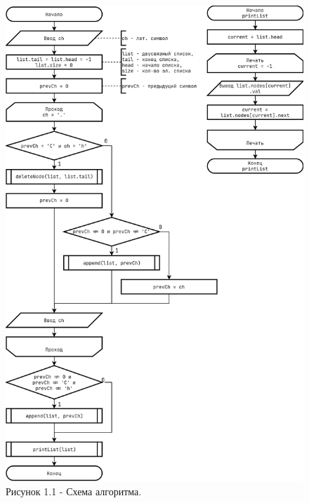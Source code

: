 \documentclass[oneside,a4paper,14pt]{extarticle}
\begin{document}
\newpage
\begin{figure}[!ht]
	\centering
	\includegraphics[height=0.9\textheight]{pics/flowchart_p1.png}
	\caption*{Рисунок 1.1 - Схема алгоритма.}
\end{figure}
\end{document}
